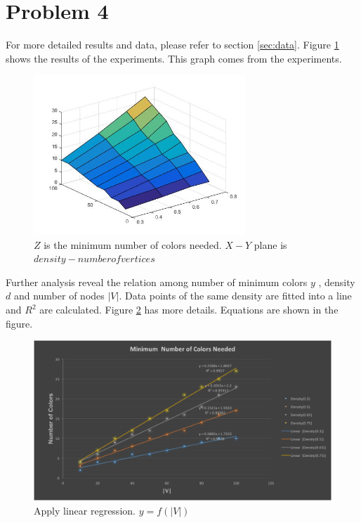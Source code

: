 \documentclass[paper=a4, fontsize=11pt]{scrartcl} %
\numberwithin{equation}{section} %
\numberwithin{figure}{section} %
\numberwithin{table}{section} %
\begin{document}
\section{Problem 4}

For more detailed results and data, please refer to section \ref{sec:data}. Figure \ref{fig:mincolor} shows the results of the experiments. This graph comes from the experiments.
\begin{figure}[htp]
\centering
\includegraphics[width=8cm]{MinColor}
\centering
\caption{$Z$ is the minimum number of colors needed. $X-Y$ plane is $density-number of vertices$ }
\label{fig:mincolor}
\end{figure}

Further analysis reveal the relation among number of minimum colors $y$ , density $d$ and number of nodes $|V|$. Data points of the same density are fitted into a line and $R^{2}$ are calculated. Figure \ref{fig:coloranalysis} has more details. Equations are shown in the figure.

\begin{figure}[htp]
\centering
\includegraphics[width=13cm]{minimumcolor}
\centering
\caption{Apply linear regression. $y = f(|V|)$ }
\label{fig:coloranalysis}
\end{figure}
\end{document}
